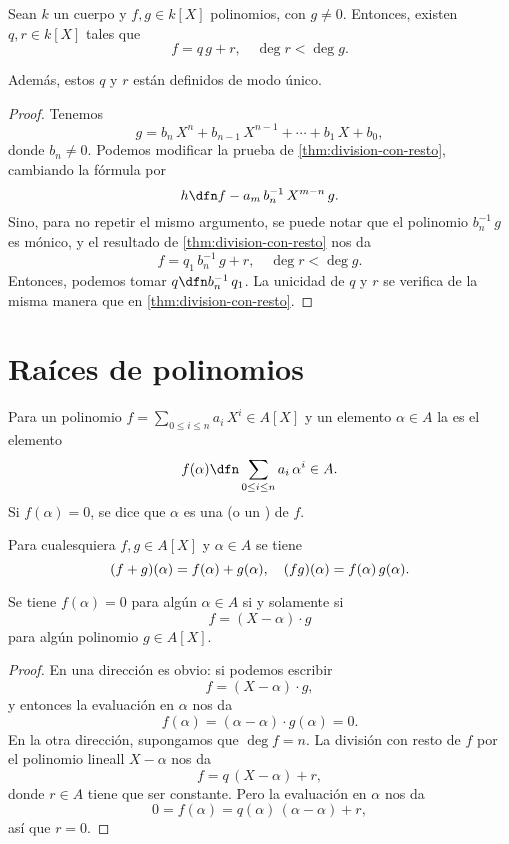 \begin{corolario}
  Sean $k$ un cuerpo y $f, g \in k [X]$ polinomios, con $g \ne 0$. Entonces,
  existen $q, r \in k [X]$ tales que
  $$f = q\,g + r, \quad \deg r < \deg g.$$

  Además, estos $q$ y $r$ están definidos de modo único.

  \begin{proof}
    Tenemos
    $$g = b_n\,X^n + b_{n-1}\,X^{n-1} + \cdots + b_1\,X + b_0,$$
    donde $b_n \ne 0$. Podemos modificar la prueba de
    \ref{thm:division-con-resto}, cambiando la fórmula
     por
    $$h \dfn f - a_m\,b_n^{-1}\,X^{m-n}\,g.$$
    Sino, para no repetir el mismo argumento, se puede notar que el polinomio
    $b_n^{-1}\,g$ es mónico, y el resultado de \ref{thm:division-con-resto} nos
    da
    $$f = q_1\,b_n^{-1}\,g + r, \quad \deg r < \deg g.$$
    Entonces, podemos tomar $q \dfn b_n^{-1}\,q_1$. La unicidad de $q$ y $r$ se
    verifica de la misma manera que en \ref{thm:division-con-resto}.
  \end{proof}
\end{corolario}


\section{Raíces de polinomios}

\begin{definicion}
  Para un polinomio $f = \sum_{0\le i\le n} a_i\,X^i \in A [X]$ y un elemento
  $\alpha\in A$ la  es el elemento
  $$f (\alpha) \dfn \sum_{0\le i\le n} a_i\,\alpha^i \in A.$$
  Si $f (\alpha) = 0$, se dice que $\alpha$ es una  (o un ) de $f$.
\end{definicion}

\begin{observacionejerc}
  Para cualesquiera $f,g \in A [X]$ y $\alpha \in A$ se tiene
  \[ (f+g) (\alpha) = f (\alpha) + g (\alpha), \quad
    (fg) (\alpha) = f (\alpha)\,g (\alpha). \qedhere \]
\end{observacionejerc}

\begin{proposicion}
  Se tiene $f (\alpha) = 0$ para algún $\alpha \in A$ si y solamente si
  $$f = (X-\alpha)\cdot g$$
  para algún polinomio $g\in A [X]$.

  \begin{proof}
    En una dirección es obvio: si podemos escribir
    $$f = (X-\alpha)\cdot g,$$
    y entonces la evaluación en $\alpha$ nos da
    $$f (\alpha) = (\alpha-\alpha)\cdot g (\alpha) = 0.$$
    En la otra dirección, supongamos que $\deg f = n$. La división con resto de
    $f$ por el polinomio lineall $X-\alpha$ nos da
    $$f = q\,(X-\alpha) + r,$$
    donde $r \in A$ tiene que ser constante. Pero la evaluación en $\alpha$ nos
    da
    $$0 = f (\alpha) = q (\alpha)\,(\alpha-\alpha) + r,$$
    así que $r = 0$.
  \end{proof}
\end{proposicion}


